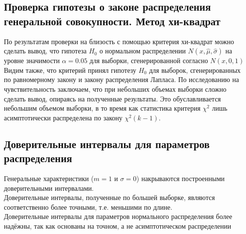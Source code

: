\documentclass[14pt,a4paper,article]{ncc}
\begin{document}
\subsection{Проверка гипотезы о законе распределения генеральной совокупности. Метод хи-квадрат}
\begin{flushleft}
По результатам проверки на близость с помощью критерия хи-квадрат можно сделать вывод, что гипотеза $H_{0}$ о нормальном распределении  $N(x,\hat{\mu}, \hat{\sigma})$ на уровне значимости $\alpha = 0.05$ для выборки, сгенерированной согласно $N(x,0,1)$
Видим также, что критерий принял гипотезу $H_{0}$ для выборок, сгенерированных по равномерному закону и закону распределения Лапласа.
\newline
По исследованию на чувствительность заключаем, что при небольших объемах выборки сложно сделать вывод, опираясь на полученные результаты. Это обуславливается небольшим объемом выборки, в то время как статистика критерия $\chi^2$ лишь асимптотически распределена по закону $\chi^2(k-1)$.
\end{flushleft}
\subsection{Доверительные интервалы для параметров распределения}
\begin{flushleft}
Генеральные характеристики ($m = 1$ и $\sigma = 0$) накрываются построенными доверительными интервалами. \\
Доверительные интервалы, полученные по большей выборке, являются соответственно более точными, т.е. меньшими по длине.\\
Доверительные интервалы для параметров нормального распределения более надёжны, так как основаны на точном, а не асимптотическом распределении
\end{flushleft}
\end{document}

